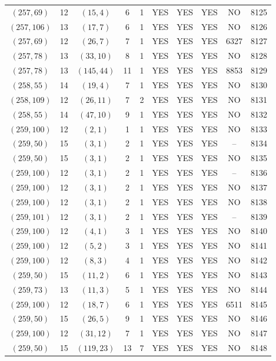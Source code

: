 \begin{longtable}{|c|c|c|c|c|c|c|c|c|c|}
$(257, 69)$ & 12 & $(15, 4)$ & 6 & 1 & YES & YES & YES & NO & 8125\\
$(257, 106)$ & 13 & $(17, 7)$ & 6 & 1 & YES & YES & YES & NO & 8126\\
$(257, 69)$ & 12 & $(26, 7)$ & 7 & 1 & YES & YES & YES & 6327 & 8127\\
$(257, 78)$ & 13 & $(33, 10)$ & 8 & 1 & YES & YES & YES & NO & 8128\\
$(257, 78)$ & 13 & $(145, 44)$ & 11 & 1 & YES & YES & YES & 8853 & 8129\\
$(258, 55)$ & 14 & $(19, 4)$ & 7 & 1 & YES & YES & YES & NO & 8130\\
$(258, 109)$ & 12 & $(26, 11)$ & 7 & 2 & YES & YES & YES & NO & 8131\\
$(258, 55)$ & 14 & $(47, 10)$ & 9 & 1 & YES & YES & YES & NO & 8132\\
$(259, 100)$ & 12 & $(2, 1)$ & 1 & 1 & YES & YES & YES & NO & 8133\\
$(259, 50)$ & 15 & $(3, 1)$ & 2 & 1 & YES & YES & YES & -- & 8134\\
$(259, 50)$ & 15 & $(3, 1)$ & 2 & 1 & YES & YES & YES & NO & 8135\\
$(259, 100)$ & 12 & $(3, 1)$ & 2 & 1 & YES & YES & YES & -- & 8136\\
$(259, 100)$ & 12 & $(3, 1)$ & 2 & 1 & YES & YES & YES & NO & 8137\\
$(259, 100)$ & 12 & $(3, 1)$ & 2 & 1 & YES & YES & YES & NO & 8138\\
$(259, 101)$ & 12 & $(3, 1)$ & 2 & 1 & YES & YES & YES & -- & 8139\\
$(259, 100)$ & 12 & $(4, 1)$ & 3 & 1 & YES & YES & YES & NO & 8140\\
$(259, 100)$ & 12 & $(5, 2)$ & 3 & 1 & YES & YES & YES & NO & 8141\\
$(259, 100)$ & 12 & $(8, 3)$ & 4 & 1 & YES & YES & YES & NO & 8142\\
$(259, 50)$ & 15 & $(11, 2)$ & 6 & 1 & YES & YES & YES & NO & 8143\\
$(259, 73)$ & 13 & $(11, 3)$ & 5 & 1 & YES & YES & YES & NO & 8144\\
$(259, 100)$ & 12 & $(18, 7)$ & 6 & 1 & YES & YES & YES & 6511 & 8145\\
$(259, 50)$ & 15 & $(26, 5)$ & 9 & 1 & YES & YES & YES & NO & 8146\\
$(259, 100)$ & 12 & $(31, 12)$ & 7 & 1 & YES & YES & YES & NO & 8147\\
$(259, 50)$ & 15 & $(119, 23)$ & 13 & 7 & YES & YES & YES & NO & 8148\\

\end{longtable}
